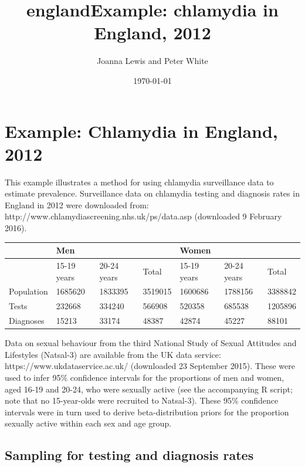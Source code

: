 \documentclass{article}
\title{england}
\begin{document}
    
    
    \author{Joanna Lewis and Peter White}\title{Example: chlamydia in England, 2012}

\date{\today}
\maketitle

\tableofcontents


    
    

    
    \section{Example: Chlamydia in England,
2012}\label{example-chlamydia-in-england-2012}

This example illustrates a method for using chlamydia surveillance data
to estimate prevalence. Surveillance data on chlamydia testing and
diagnosis rates in England in 2012 were downloaded from:
http://www.chlamydiascreening.nhs.uk/ps/data.asp (downloaded 9 February
2016).

\begin{longtable}[c]{@{}lllllll@{}}
\toprule
& Men & & & Women & &\tabularnewline
\midrule
\endhead
& 15-19 years & 20-24 years & Total & 15-19 years & 20-24 years &
Total\tabularnewline
Population & 1685620 & 1833395 & 3519015 & 1600686 & 1788156 &
3388842\tabularnewline
Tests & 232668 & 334240 & 566908 & 520358 & 685538 &
1205896\tabularnewline
Diagnoses & 15213 & 33174 & 48387 & 42874 & 45227 & 88101\tabularnewline
\bottomrule
\end{longtable}

Data on sexual behaviour from the third National Study of Sexual
Attitudes and Lifestyles (Natsal-3) are available from the UK data
service: https://www.ukdataservice.ac.uk/ (downloaded 23 September
2015). These were used to infer 95\% confidence intervals for the
proportions of men and women, aged 16-19 and 20-24, who were sexually
active (see the accompanying R script; note that no 15-year-olds were
recruited to Natsal-3). These 95\% confidence intervals were in turn
used to derive beta-distribution priors for the proportion sexually
active within each sex and age group.

\subsection{Sampling for testing and diagnosis
rates}\label{sampling-for-testing-and-diagnosis-rates}
\end{document}
